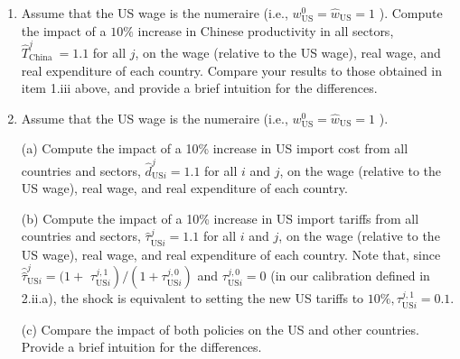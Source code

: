 \documentclass[12pt,oneside,reqno]{article}
\begin{document}
\begin{enumerate}[label=\roman*., leftmargin=*]
iv. Given $\hat{w}(b)$ and $X^{0} \hat{X}(b)$, compute the excess labor demand implied by the labor market clearing in (8):

\begin{equation*}
Z_{i}(\hat{w}(b))=\sum_{n} \sum_{j} \frac{\gamma_{i}^{j}}{1+\tau_{n i}^{j, 1}} \frac{X_{n i}^{j, 0} \hat{X}_{n i}^{j}(b)}{w_{i}^{0} L_{i}^{0}}-\hat{w}_{i}(b) \hat{L}_{i} .
\end{equation*}

(c) If $\max _{i \neq \mathrm{US}}\left\{\left|Z_{i}(\hat{w}(b))\right|\right\}<t o l$, then stop. Otherwise, compute a new guess for $i \neq \mathrm{US}$ :

\begin{equation*}
\hat{w}_{i}(b+1)=\hat{w}_{i}(b)+\kappa^{w} Z_{i}(\hat{w}(b))
\end{equation*}

where $\kappa^{w}$ is a positive constant.

(d) Compute changes in the real wage $\left(\hat{w}_{n} / \hat{P}_{n}\right)$ and real expenditure $\left(\hat{X}_{n} / \hat{P}_{n}\right)$.

\item Assume that the US wage is the numeraire (i.e., $w_{\mathrm{US}}^{0}=\hat{w}_{\mathrm{US}}=1$ ). Compute the impact of a $10 \%$ increase in Chinese productivity in all sectors, $\hat{T}_{\text {China }}^{j}=1.1$ for all $j$, on the wage (relative to the US wage), real wage, and real expenditure of each country. Compare your results to those obtained in item 1.iii above, and provide a brief intuition for the differences.

\item Assume that the US wage is the numeraire (i.e., $w_{\mathrm{US}}^{0}=\hat{w}_{\mathrm{US}}=1$ ).

(a) Compute the impact of a 10\% increase in US import cost from all countries and sectors, $\hat{d}_{\mathrm{US} i}^{j}=1.1$ for all $i$ and $j$, on the wage (relative to the US wage), real wage, and real expenditure of each country.

(b) Compute the impact of a 10\% increase in US import tariffs from all countries and sectors, $\hat{\tau}_{\mathrm{US} i}^{j}=1.1$ for all $i$ and $j$, on the wage (relative to the US wage), real wage, and real expenditure of each country. Note that, since $\hat{\hat{\tau}}_{\mathrm{US} i}^{j}=(1+$ $\left.\tau_{\mathrm{US} i}^{j, 1}\right) /\left(1+\tau_{\mathrm{US} i}^{j, 0}\right)$ and $\tau_{\mathrm{US} i}^{j, 0}=0$ (in our calibration defined in 2.ii.a), the shock is equivalent to setting the new US tariffs to $10 \%, \tau_{\mathrm{US} i}^{j, 1}=0.1$.

(c) Compare the impact of both policies on the US and other countries. Provide a brief intuition for the differences.

\end{enumerate}
\end{document}
